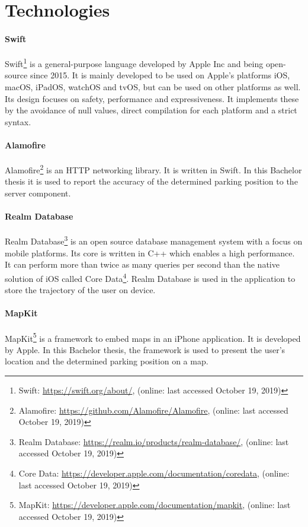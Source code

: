 \section{Technologies}

\paragraph{Swift} Swift\footnote{Swift: \url{https://swift.org/about/}, (online: last accessed October 19, 2019)} is a general-purpose language developed by Apple Inc and being open-source since 2015. It is mainly developed to be used on Apple's platforms iOS, macOS, iPadOS, watchOS and tvOS, but can be used on other platforms as well. Its design focuses on safety, performance and expressiveness. It implements these by the avoidance of null values, direct compilation for each platform and a strict syntax. \cite{apple:swift}

\paragraph{Alamofire} Alamofire\footnote{Alamofire: \url{https://github.com/Alamofire/Alamofire}, (online: last accessed October 19, 2019)} is an HTTP networking library. It is written in Swift. In this Bachelor thesis it is used to report the accuracy of the determined parking position to the server component. \cite{alamofire}

\paragraph{Realm Database} Realm Database\footnote{Realm Database: \url{https://realm.io/products/realm-database/}, (online: last accessed October 19, 2019)} is an open source database management system with a focus on mobile platforms. Its core is written in C++ which enables a high performance. It can perform more than twice as many queries per second than the native solution of iOS called Core Data\footnote{Core Data: \url{https://developer.apple.com/documentation/coredata}, (online: last accessed October 19, 2019)}.  Realm Database is used in the application to store the trajectory of the user on device. \cite{realm}

\paragraph{MapKit} MapKit\footnote{MapKit: \url{https://developer.apple.com/documentation/mapkit}, (online: last accessed October 19, 2019)} is a framework to embed maps in an iPhone application. It is developed by Apple. In this Bachelor thesis, the framework is used to present the user's location and the determined parking position on a map. \cite{apple:MapKit}

